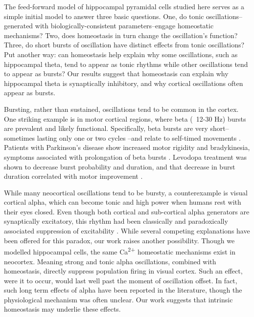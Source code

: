 \documentclass{article}
\begin{document}
The feed-forward model of hippocampal pyramidal cells studied here serves as a simple initial model to answer three basic questions. One, do tonic oscillations--generated with biologically-consistent parameters--engage homeostatic mechanisms? Two, does homeostasis in turn change the oscillation's function? Three, do short bursts of oscillation have distinct effects from tonic oscillations? Put another way: can homeostasis help explain why some oscillations, such as hippocampal theta, tend to appear as tonic rhythms while other oscillations tend to appear as bursts? Our results suggest that homeostasis can explain why hippocampal theta is synaptically inhibitory, and why cortical oscillations often appear as bursts.

Bursting, rather than sustained, oscillations tend to be common in the cortex. One striking example is in motor cortical regions, where beta (~12-30 Hz) bursts are prevalent and likely functional. Specifically, beta bursts are very short--sometimes lasting only one or two cycles \cite{Sherman2016}--and relate to self-timed movements \cite{Feingold2015}. Patients with Parkinson's disease show increased motor rigidity and bradykinesia, symptoms associated with prolongation of beta bursts \cite{Tinkhauser2017}. Levodopa treatment was shown to decrease burst probability and duration, and that decrease in burst duration correlated with motor improvement \cite{Tinkhauser2017}.

While many neocortical oscillations tend to be bursty, a counterexample is visual cortical alpha, which can become tonic and high power when humans rest with their eyes closed. Even though both cortical and sub-cortical alpha generators are synaptically excitatory, this rhythm had been classically and paradoxically associated suppression of excitability \cite{Jensen2002,Bonnefond2012,Peterson2017}. While several competing explanations have been offered \cite{Bonnefond2012,Lange2013,Peterson2017} for this paradox, our work raises another possibility. Though we modelled hippocampal cells, the same Ca\textsuperscript{2+} homeostatic mechanisms exist in neocortex. Meaning strong and tonic alpha oscillations, combined with homeostasis, directly suppress population firing in visual cortex. Such an effect, were it to occur, would last well past the moment of oscillation offset. In fact, such long term effects of alpha have been reported in the literature, though the physiological mechanism was often unclear. Our work suggests that intrinsic homeostasis may underlie these effects.
\end{document}
